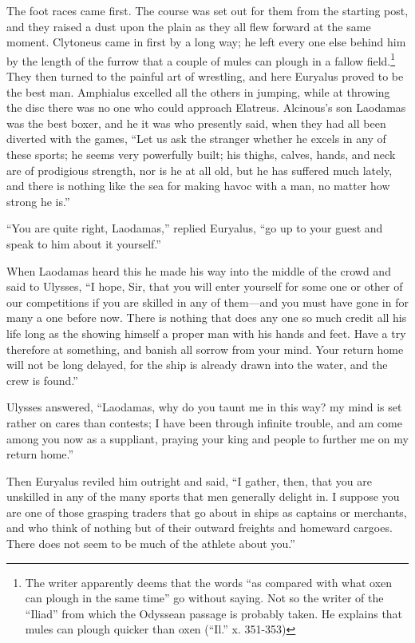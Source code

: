 The foot races came first. The course was set out for them from the starting
post, and they raised a dust upon the plain as they all flew forward at the
same moment. Clytoneus came in first by a long way; he left every one else
behind him by the length of the furrow that a couple of mules can plough in a
fallow field.\footnote{The writer apparently deems that the words “as compared with what oxen can
plough in the same time” go without saying. Not so the writer of the “Iliad”
from which the Odyssean passage is probably taken. He explains that mules can
plough quicker than oxen (“Il.” x. 351-353)}
They then turned to the painful art of wrestling, and here Euryalus proved to
be the best man. Amphialus excelled all the others in jumping, while at
throwing the disc there was no one who could approach Elatreus. Alcinous’s son
Laodamas was the best boxer, and he it was who presently said, when they had
all been diverted with the games, “Let us ask the stranger whether he excels in
any of these sports; he seems very powerfully built; his thighs, calves, hands,
and neck are of prodigious strength, nor is he at all old, but he has suffered
much lately, and there is nothing like the sea for making havoc with a man, no
matter how strong he is.”

“You are quite right, Laodamas,” replied Euryalus, “go up to your guest and
speak to him about it yourself.”

When Laodamas heard this he made his way into the middle of the crowd and said
to Ulysses, “I hope, Sir, that you will enter yourself for some one or other of
our competitions if you are skilled in any of them—and you must have gone in
for many a one before now. There is nothing that does any one so much credit
all his life long as the showing himself a proper man with his hands and feet.
Have a try therefore at something, and banish all sorrow from your mind. Your
return home will not be long delayed, for the ship is already drawn into the
water, and the crew is found.”

Ulysses answered, “Laodamas, why do you taunt me in this way? my mind is set
rather on cares than contests; I have been through infinite trouble, and am
come among you now as a suppliant, praying your king and people to further me
on my return home.”

Then Euryalus reviled him outright and said, “I gather, then, that you are
unskilled in any of the many sports that men generally delight in. I suppose
you are one of those grasping traders that go about in ships as captains or
merchants, and who think of nothing but of their outward freights and homeward
cargoes. There does not seem to be much of the athlete about you.”


